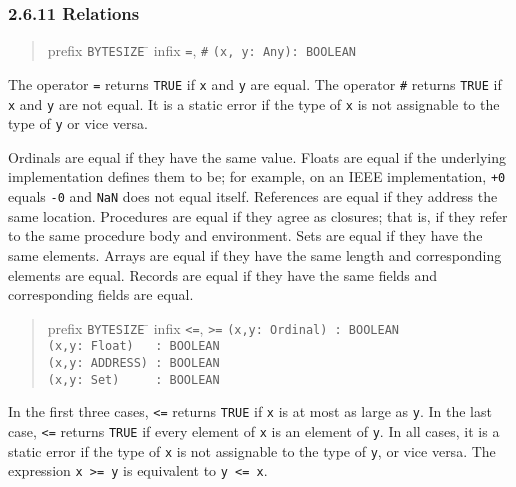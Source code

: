 \documentclass[10pt]{article}
\begin{document}
\subsubsection*{2.6.11 Relations}

\begin{quote}
  \begin{tabbing}
    prefix \= \verb|BYTESIZE| \= \kill
    infix  \> \verb|=|, \verb|#|     \> \verb|(x, y: Any): BOOLEAN|
  \end{tabbing}
\end{quote}
The operator \verb|=| returns \verb|TRUE| if \verb|x| and \verb|y| are equal.
The operator \verb|#| returns \verb|TRUE| if \verb|x| and \verb|y| are not
equal.  It is a static error if the type of \verb|x| is not assignable to the
type of \verb|y| or vice versa.

Ordinals are equal if they have the same value.  Floats are equal if the
underlying implementation defines them to be; for example, on an IEEE
implementation, \verb|+0| equals \verb|-0| and \verb|NaN| does not equal
itself.  References are equal if they address the same location.  Procedures
are equal if they agree as closures; that is, if they refer to the same
procedure body and environment.  Sets are equal if they have the same
elements.  Arrays are equal if they have the same length and corresponding
elements are equal.  Records are equal if they have the same fields and
corresponding fields are equal.

\begin{quote}
  \begin{tabbing}
    prefix \= \verb|BYTESIZE| \= \kill
    infix  \> \verb|<=|, \verb|>=| \> \verb|(x,y: Ordinal) : BOOLEAN| \\
           \>                      \> \verb|(x,y: Float)   : BOOLEAN| \\
           \>                      \> \verb|(x,y: ADDRESS) : BOOLEAN| \\
           \>                      \> \verb|(x,y: Set)     : BOOLEAN|
  \end{tabbing}
\end{quote}
In the first three cases, \verb|<=| returns \verb|TRUE| if \verb|x| is at most
as large as \verb|y|.  In the last case, \verb|<=| returns \verb|TRUE| if
every element of \verb|x| is an element of \verb|y|.  In all cases, it is a
static error if the type of \verb|x| is not assignable to the type of
\verb|y|, or vice versa.  The expression \verb|x >= y| is equivalent to
\verb|y <= x|.
\end{document}
